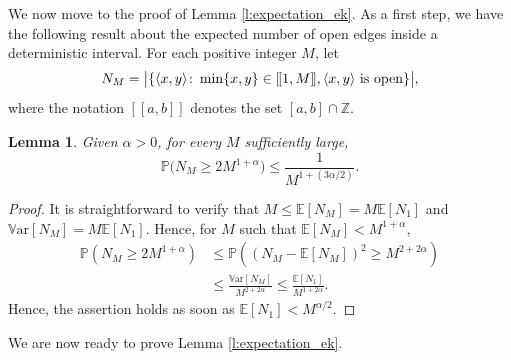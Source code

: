 \documentclass[a4paper,oneside,12pt]{amsart}
\def\llbracket{[\hspace{-.10em} [ }
\def\rrbracket{ ] \hspace{-.10em}]}
\renewcommand{\leq}{\leqslant}
\renewcommand{\geq}{\geqslant}
\newcommand{\E}{\mathbb{E}}
\theoremstyle{plain}
\newtheorem{lemma}{Lemma}
\theoremstyle{definition}
\theoremstyle{remark}
\newcommand{\Z}{{\mathbb{Z}}}
\renewcommand{\P}{\mathbb{P}}
\begin{document}
We now move to the proof of Lemma \ref{l:expectation_ek}.
As a first step, we have the following result about the expected number of open edges inside a deterministic interval. 
For each positive integer $M$, let
\[
N_M = \big\lvert \{\langle x,y \rangle  \colon \min\{x,y\} \in \llbracket 1,M \rrbracket, \langle x,y \rangle \text{ is open}\} \big\rvert,
\]
where the notation $[[a,b]]$ denotes the set $[a,b]\cap\Z$.

\begin{lemma}\label{LemmaCaixa}
Given $\alpha > 0$, for every $M$ sufficiently large,
\begin{equation*}
\P\big( N_M \geq 2M^{1+\alpha} \big) \leq \frac{1}{M^{1+(3\alpha/2)}}.
\end{equation*}
\end{lemma}
\begin{proof}
It is straightforward to verify that
$M \leq \E[N_M] = M \E[N_1]$ and $\mathbb{V}\textrm{ar}[N_M] = M \E[N_1]$.
Hence, for $M$ such that $\mathbb{E}[N_M] < M^{1+\alpha}$,
\begin{align*}
 \P(N_M \geq 2M^{1+\alpha})
&\leq \P\left((N_M - \E[N_M])^2 \geq M^{2+2\alpha}  \right) \\
&\leq \frac{\mathbb{V}\textrm{ar}[N_M]}{M^{2+2\alpha}} \leq \frac{\mathbb{E}[N_1]}{M^{1+2\alpha}}.
\end{align*}
Hence, the assertion holds as soon as $\mathbb{E}[N_1] < M^{\alpha/2}$.
\end{proof}

We are now ready to prove Lemma \ref{l:expectation_ek}.
\end{document}
